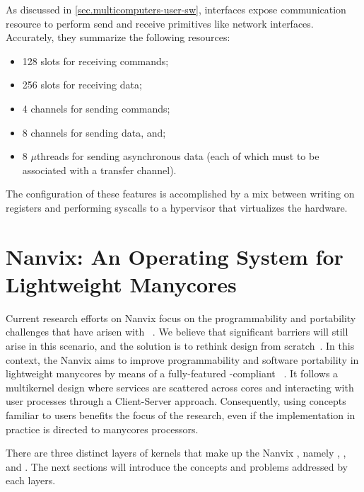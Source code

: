 	As discussed in \autoref{sec.multicomputers-user-sw}, \noc interfaces
	expose communication resource to perform send and receive primitives
	like network interfaces.
	Accurately, they summarize the following resources:

	\begin{itemize}
		\item 128 slots for receiving commands;
		\item 256 slots for receiving data;
		\item 4 channels for sending commands;
		\item 8 channels for sending data, and;
		\item 8 $\mu$threads for sending asynchronous data (each of which must
			to be associated with a transfer channel).
	\end{itemize}

	The configuration of these features is accomplished by a mix between
	writing on \dma registers and performing syscalls to a hypervisor
	that virtualizes the \mppa hardware.

\section{Nanvix: An Operating System for Lightweight Manycores}
\label{sec.nanvix}

	Current research efforts on Nanvix \os focus on the programmability and portability
	challenges that have arisen with \lightweight \manycores~\cite{christgau2017, gamell2012, serres2011}.
	We believe that significant barriers will still arise in this scenario, and the
	solution is to rethink \os design from scratch~\cite{penna:compas19, penna2019}.
	In this context, the Nanvix \os aims to improve programmability and
	software portability in lightweight manycores by means of a fully-featured
	\posix-compliant \os~\cite{penna:compas19}.
	It follows a multikernel design where \os services are scattered across cores and
	interacting with user processes through a Client-Server approach.
	Consequently, using concepts familiar to \os users benefits the focus of the research,
	even if the implementation in practice is directed to manycores processors.

	
	There are three distinct layers of kernels that make up the Nanvix \os, namely \multikernel,
	\microkernel, and \hal.
	The next sections will introduce the concepts and problems addressed by each layers.


